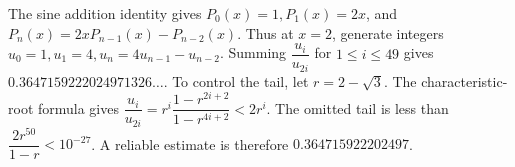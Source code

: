 The sine addition identity gives $P_0(x)=1,P_1(x)=2x$, and $P_n(x)=2xP_{n-1}(x)-P_{n-2}(x)$. Thus at $x=2$, generate integers $u_0=1,u_1=4,u_n=4u_{n-1}-u_{n-2}$. Summing $\dfrac{u_i}{u_{2i}}$ for $1\le i\le49$ gives $0.3647159222024971326\ldots$. To control the tail, let $r=2-\sqrt3$. The characteristic-root formula gives $\dfrac{u_i}{u_{2i}}=r^i\dfrac{1-r^{2i+2}}{1-r^{4i+2}}<2r^i$. The omitted tail is less than $\dfrac{2r^{50}}{1-r}<10^{-27}$. A reliable estimate is therefore $\boxed{0.364715922202497}$.
